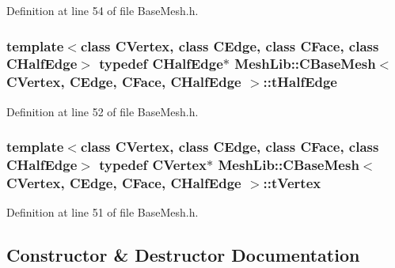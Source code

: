 Definition at line 54 of file Base\+Mesh.\+h.

\subsubsection[{\texorpdfstring{t\+Half\+Edge}{tHalfEdge}}]{\setlength{\rightskip}{0pt plus 5cm}template$<$class C\+Vertex, class C\+Edge, class C\+Face, class C\+Half\+Edge$>$ typedef {\bf C\+Half\+Edge}$\ast$ {\bf Mesh\+Lib\+::\+C\+Base\+Mesh}$<$ {\bf C\+Vertex}, {\bf C\+Edge}, {\bf C\+Face}, {\bf C\+Half\+Edge} $>$\+::{\bf t\+Half\+Edge}}\hypertarget{class_mesh_lib_1_1_c_base_mesh_a30024aa977abb5ab248e7c87ba1ec109}{}\label{class_mesh_lib_1_1_c_base_mesh_a30024aa977abb5ab248e7c87ba1ec109}


Definition at line 52 of file Base\+Mesh.\+h.

\subsubsection[{\texorpdfstring{t\+Vertex}{tVertex}}]{\setlength{\rightskip}{0pt plus 5cm}template$<$class C\+Vertex, class C\+Edge, class C\+Face, class C\+Half\+Edge$>$ typedef {\bf C\+Vertex}$\ast$ {\bf Mesh\+Lib\+::\+C\+Base\+Mesh}$<$ {\bf C\+Vertex}, {\bf C\+Edge}, {\bf C\+Face}, {\bf C\+Half\+Edge} $>$\+::{\bf t\+Vertex}}\hypertarget{class_mesh_lib_1_1_c_base_mesh_adcf412e8267910b50f3145d6416947da}{}\label{class_mesh_lib_1_1_c_base_mesh_adcf412e8267910b50f3145d6416947da}


Definition at line 51 of file Base\+Mesh.\+h.



\subsection{Constructor \& Destructor Documentation}
